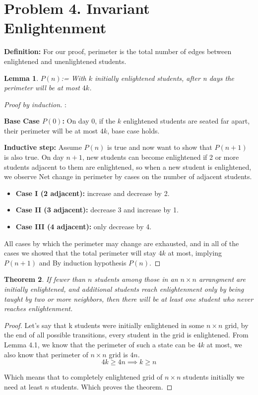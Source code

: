 \documentclass{article}
\newtheorem{theorem}{Theorem}[section]
\newtheorem{lemma}[theorem]{Lemma}
\begin{document}
\setcounter{section}{4}
\section*{Problem 4. Invariant Enlightenment}

\textbf{Definition:} For our proof, perimeter is the total number of edges between enlightened and unenlightened students.  

\begin{lemma}
    $P(n)$:= With $k$ initially enlightened students, after n days the perimeter will be at most $4k$.
\end{lemma}

\begin{proof}[Proof by induction]:
    
    \textbf{Base Case $P(0)$:} On day 0, if the $k$ enlightened students are seated far apart, their perimeter will be at most $4k$, 
     base case holds.
    
    \textbf{Inductive step:} Assume $P(n)$ is true and now want to show that $P(n+1)$ is also true. 
    On day $n+1$, new students can become enlightened if 2 or more students adjacent to them are enlightened, so when a new student is enlightened, we observe Net change in perimeter by cases on the number of adjacent students.
    \begin{itemize}
        \item \textbf{Case I (2 adjacent):} increase and decrease by 2. 
        \item \textbf{Case II (3 adjacent):} decrease 3 and increase by 1.
        \item \textbf{Case III (4 adjacent):} only decrease by 4.
    \end{itemize}

    All cases by which the perimeter may change are exhausted, and in all of the cases we showed that the total perimeter will stay $4k$ 
    at most, implying $P(n+1)$ and By induction hypothesis $P(n)$.
\end{proof}

\begin{theorem}
If fewer than $n$ students among those in an $n \times n$ arrangment are initially enlightened, and 
additional students reach enlightenment only by being taught by two or more neighbors, then there will be
at least one student who never reaches enlightenment.
\end{theorem}

\begin{proof}
    Let's say that k students were initially enlightened in some $n \times n$ grid, by the end of all possible
    transitions, every student in the grid is enlightened. From Lemma 4.1, we know that the perimeter of such a state can 
    be $4k$ at most, we also know that perimeter of $n \times n$ grid is $4n$.
    \[4k \geq 4n \implies k \geq n\]

    Which means that to completely enlightened grid of $n \times n$ students initially we need at least $n$ students. Which proves the theorem.

\end{proof}
\end{document}
